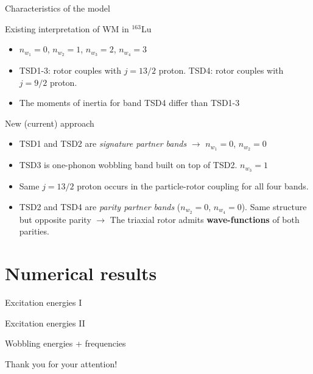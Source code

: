 \documentclass{beamer}
\begin{document}
\begin{frame}{Characteristics of the model}
    \begin{block}{Existing interpretation of WM in $^{163}$Lu}
    \begin{itemize}
        \item $n_{w_1}=0$, $n_{w_2}=1$, $n_{w_3}=2$, $n_{w_4}=3$
        \item TSD1-3: rotor couples with $j=13/2$ proton. TSD4: rotor couples with $j=9/2$ proton.
        \item The moments of inertia for band TSD4 differ than TSD1-3
    \end{itemize}
    \end{block}
    \begin{alertblock}{New (current) approach}
    \begin{itemize}
        \item TSD1 and TSD2 are \emph{signature partner bands} $\to$ $n_{w_1}=0$, $n_{w_2}=0$
        \item TSD3 is one-phonon wobbling band built on top of TSD2. $n_{w_3}=1$
        \item Same $j=13/2$ proton occurs in the particle-rotor coupling for all four bands.
        \item TSD2 and TSD4 are \emph{parity partner bands} ($n_{w_2}=0$, $n_{w_4}=0$). Same structure but opposite parity $\to$ The triaxial rotor admits \textbf{wave-functions} of both parities.
    \end{itemize}
    \end{alertblock}
\end{frame}

\section{Numerical results}

\begin{frame}{Excitation energies I}
    
\end{frame}

\begin{frame}{Excitation energies II}
    
\end{frame}

\begin{frame}{Wobbling energies + frequencies}
    
\end{frame}


\begin{frame}
\Huge{\centerline{Thank you for your attention!}}
\end{frame}
\end{document}
